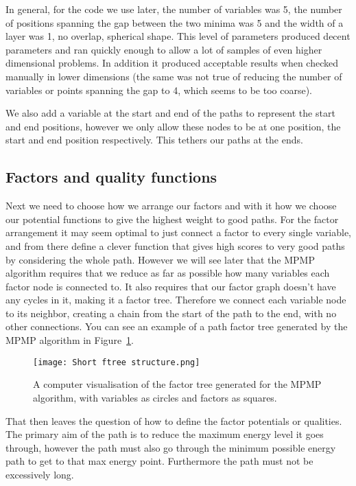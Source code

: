 In general, for the code we use later, the number of variables was 5, the number of positions spanning the gap between the two minima was 5 and the width of a layer was 1, no overlap, spherical shape.
This level of parameters produced decent parameters and ran quickly enough to allow a lot of samples of even higher dimensional problems.
In addition it produced acceptable results when checked manually in lower dimensions (the same was not true of reducing the number of variables or points spanning the gap to 4, which seems to be too coarse).

We also add a variable at the start and end of the paths to represent the start and end positions, however we only allow these nodes to be at one position, the start and end position respectively. 
This tethers our paths at the ends.

\FloatBarrier
\subsection{Factors and quality functions}
\label{subsec:fac_qual}
Next we need to choose how we arrange our factors and with it how we choose our potential functions to give the highest weight to good paths.
For the factor arrangement it may seem optimal to just connect a factor to every single variable, and from there define a clever function that gives high scores to very good paths by considering the whole path.
However we will see later that the MPMP algorithm requires that we reduce as far as possible how many variables each factor node is connected to.
It also requires that our factor graph doesn't have any cycles in it, making it a factor tree.
Therefore we connect each variable node to its neighbor, creating a chain from the start of the path to the end, with no other connections.
You can see an example of a path factor tree generated by the MPMP algorithm in Figure~\ref{fig:path_ftree}.

\begin{figure}[h]
    \centering
    \texttt{[image: Short ftree structure.png]}
    \caption{A computer visualisation of the factor tree generated for the MPMP algorithm, with variables as circles and factors as squares.}
    \label{fig:path_ftree}
\end{figure}

That then leaves the question of how to define the factor potentials or qualities.
The primary aim of the path is to reduce the maximum energy level it goes through, however the path must also go through the minimum possible energy path to get to that max energy point.
Furthermore the path must not be excessively long.

